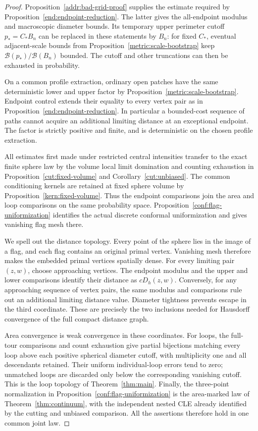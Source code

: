 \begin{proof}
Proposition~\ref{addr:bad-grid-proof} supplies the estimate
required by Proposition~\ref{end:endpoint-reduction}.
The latter gives the all-endpoint modulus and macroscopic
diameter bounds.  Its temporary upper perimeter cutoff
$p_*=C_*B_n$ can be replaced in these statements by $B_n$:
for fixed $C_*$, eventual adjacent-scale bounds from
Proposition~\ref{metric:scale-bootstrap} keep
$\mathcal B(p_*)/\mathcal B(B_n)$ bounded.  The cutoff and
other truncations can then be exhausted in probability.

On a common profile extraction, ordinary open patches have
the same deterministic lower and upper factor by
Proposition~\ref{metric:scale-bootstrap}.  Endpoint control
extends their equality to every vertex pair as in
Proposition~\ref{end:endpoint-reduction}.  In particular a
bounded-cost sequence of paths cannot acquire an additional
limiting distance at an exceptional endpoint.  The factor is
strictly positive and finite, and is deterministic on the
chosen profile extraction.

All estimates first made under restricted central intensities
transfer to the exact finite sphere law by the volume local
limit domination and counting exhaustion in
Proposition~\ref{cut:fixed-volume} and
Corollary~\ref{cut:unbiased}.  The common conditioning kernels
are retained at fixed sphere volume by
Proposition~\ref{kern:fixed-volume}.  Thus the endpoint
comparisons join the area and loop comparisons on the same
probability space.  Proposition~\ref{conf:flag-uniformization}
identifies the actual discrete conformal uniformization and
gives vanishing flag mesh there.

We spell out the distance topology.  Every point of the sphere
lies in the image of a flag, and each flag contains an original
primal vertex.  Vanishing mesh therefore makes the embedded
primal vertices spatially dense.  For every limiting pair
$(z,w)$, choose approaching vertices.  The endpoint modulus
and the upper and lower comparisons identify their distance
as $cD_h(z,w)$.  Conversely, for any approaching sequence
of vertex pairs, the same modulus and comparisons rule out
an additional limiting distance value.  Diameter tightness
prevents escape in the third coordinate.  These are precisely
the two inclusions needed for Hausdorff convergence of the
full compact distance graph.

Area convergence is weak convergence in these coordinates.
For loops, the full-tour comparisons and count exhaustion
give partial bijections matching every loop above each
positive spherical diameter cutoff, with multiplicity one
and all descendants retained.  Their uniform individual-loop
errors tend to zero; unmatched loops are discarded only
below the corresponding vanishing cutoff.  This is the
loop topology of Theorem~\ref{thm:main}.  Finally, the
three-point normalization in
Proposition~\ref{conf:flag-uniformization} is the
area-marked law of Theorem~\ref{thm:continuum}, with
the independent nested CLE already identified by the
cutting and unbiased comparison.  All the assertions
therefore hold in one common joint law.
\end{proof}

